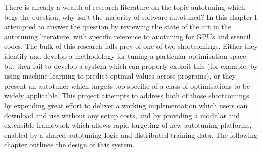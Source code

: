There is already a wealth of research literature on the topic
autotuning which begs the question, why isn't the majority of software
autotuned? In this chapter I attempted to answer the question by
reviewing the state of the art in the autotuning literature, with
specific reference to auotuning for GPUs and stencil codes. The bulk
of this research falls prey of one of two shortcomings. Either they
identify and develop a methodology for tuning a particular
optimisation space but then fail to develop a system which can
properly exploit this (for example, by using machine learning to
predict optimal values across programs), or they present an autotuner
which targets too specific of a class of optimisations to be widely
applicable. This project attempts to address both of those
shortcomings by expending great effort to deliver a working
implementation which users can download and use without any setup
costs, and by providing a modular and extensible framework which
allows rapid targeting of new autotuning platforms, enabled by a
shared autotuning logic and distributed training data. The following
chapter outlines the design of this system.
